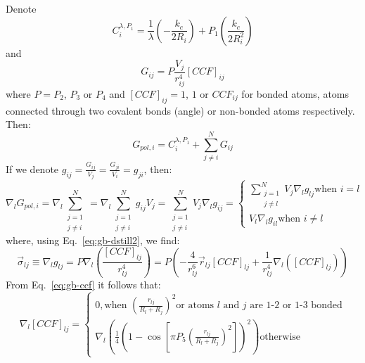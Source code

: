 \documentclass[11pt]{book}
\begin{document}
Denote
\begin{equation}\label{eq:gb-dstill1}
C^{\lambda,P_{1}}_{i} = \frac{1}{\lambda}\left(-\frac{k_{c}}{2R_{i}}\right)+P_{1}\left(\frac{k_{c}}{2R_{i}^{2}}\right)
\end{equation}
and
\begin{equation}\label{eq:gb-dstill2}
G_{ij}=P\frac{V_{j}}{r_{ij}^{4}}\left[CCF\right]_{ij}
\end{equation}
where $P=P_{2}$, $P_{3}$ or $P_{4}$ and $\left[CCF\right]_{ij}=1$, $1$ or $CCF_{ij}$ for bonded atoms, atoms connected through two covalent bonds (angle) or non-bonded atoms respectively. Then:
\begin{equation}\label{eq:gb-dstill3}
G_{pol,i}=C^{\lambda,P_{1}}_{i}+\sum_{j\ne i}^{N}G_{ij}
\end{equation}
If we denote $g_{ij}=\frac{G_{ij}}{V_{j}}=\frac{G_{ji}}{V_{i}}=g_{ji}$, then:
\begin{equation}\label{eq:gb-dstill4}
\nabla_{l}G_{pol,i}=\nabla_{l}\sum_{\substack{j=1\\j\ne i}}^{N}=\nabla_{l}\sum_{\substack{j=1\\j\ne i}}^{N}g_{ij}V_{j}=\sum_{\substack{j=1\\j\ne i}}^{N}V_{j}\nabla_{l}g_{ij}=
\begin{cases}
\sum_{\substack{j=1\\j\ne l}}^{N}V_{j}\nabla_{l}g_{lj}\text{when }i=l \\
V_{l}\nabla_{l}g_{il} \text{when } i\ne l
\end{cases}
\end{equation}
where, using Eq.~\ref{eq:gb-dstill2}, we find:
\begin{equation}\label{eq:gb-dstill5}
\vec{\sigma}_{lj}\equiv\nabla_{l}g_{lj}=P\nabla_{l}\left(\frac{[CCF]_{lj}}{r_{lj}^{4}}\right)=P\left(-\frac{4}{r_{lj}^{6}}\vec{r}_{lj}[CCF]_{lj}+\frac{1}{r_{lj}^{4}}\nabla_{l}\left([CCF]_{lj}\right)\right)
\end{equation}
From Eq.~\ref{eq:gb-ccf} it follows that:
\begin{equation}\label{eq:gb-dstill6}
\nabla_{l}[CCF]_{lj}=
\begin{cases}
0, \text{when } \left(\frac{r_{lj}}{R_{l}+R_{j}}\right)^{2} \text{or atoms $l$ and $j$ are 1-2 or 1-3 bonded}\\
\nabla_{l}\left(\frac{1}{4}\left(1-\cos{\left[\pi P_{5}\left(\frac{r_{lj}}{R_{l}+R_{j}}\right)^{2}\right]}\right)^{2}\right) \text{otherwise}
\end{cases}
\end{equation}
\end{document}
